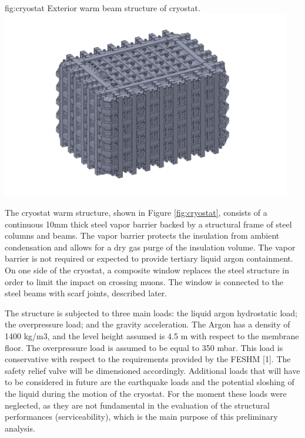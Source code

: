 \begin{dunefigure}{fig:cryostat}
{Exterior warm beam structure of  cryostat.}
\includegraphics[width=0.95\textwidth]{graphics/cryostat/cryostat.png}
\end{dunefigure}

The  cryostat warm structure, shown in Figure \ref{fig:cryostat}, consists of a continuous 10mm thick steel vapor barrier backed by a structural frame of steel columns and beams. The vapor barrier protects the insulation from ambient condensation and allows for a dry gas purge of the insulation volume. The vapor barrier is not required or expected to provide tertiary liquid argon containment. On one side of the cryostat, a composite window replaces the steel structure in order to limit the impact on crossing muons. The window is connected to the steel beams with scarf joints, described later.

The structure is subjected to three main loads: the liquid argon hydrostatic load; the overpressure load; and the gravity acceleration. The Argon has a density of 1400 kg/m3, and the level height assumed is 4.5 m with respect to the membrane floor. The overpressure load is assumed to be equal to 350 mbar. This load is conservative with respect to the requirements provided by the FESHM [1]. The safety relief valve will be dimensioned accordingly. Additional loads that will have to be considered in future are the earthquake loads and the potential sloshing of the liquid during the motion of the cryostat. For the moment these loads were neglected, as they are not fundamental in the evaluation of the structural performances (serviceability), which is the main purpose of this preliminary analysis.

